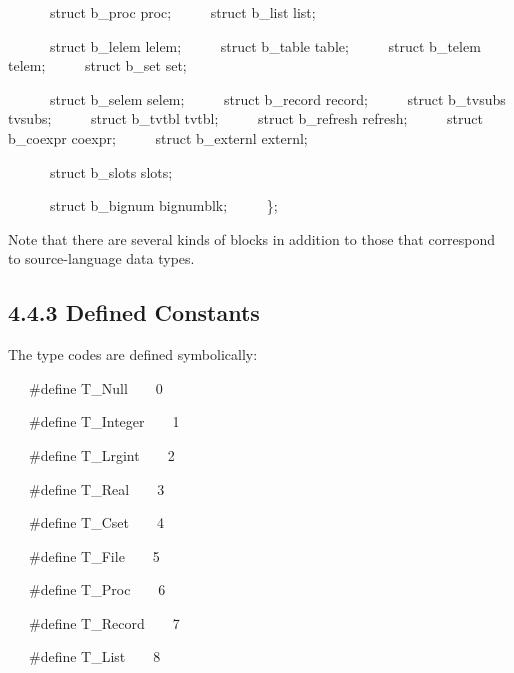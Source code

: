 {\ttfamily\mdseries
\ \ \ \ \ \ struct b\_proc proc;\newline
 \ \ \ \ \ struct b\_list list;}

{\ttfamily\mdseries
\ \ \ \ \ \ struct b\_lelem lelem;\newline
 \ \ \ \ \ struct b\_table table;\newline
 \ \ \ \ \ struct b\_telem telem;\newline
 \ \ \ \ \ struct b\_set set;}


\ \ \ \ \ \ struct b\_selem selem;\newline
 \ \ \ \ \ struct b\_record record;\newline
 \ \ \ \ \ struct b\_tvsubs tvsubs;\newline
 \ \ \ \ \ struct b\_tvtbl tvtbl;\newline
 \ \ \ \ \ struct b\_refresh refresh;\newline
 \ \ \ \ \ struct b\_coexpr coexpr;\newline
 \ \ \ \ \ struct b\_externl externl;


\ \ \ \ \ \ struct b\_slots slots;


\ \ \ \ \ \ struct b\_bignum bignumblk;\newline
 \ \ \ \ \ \};


Note that there are several kinds of blocks in addition to those that
correspond to source-language data types.

\subsection[4.4.3 Defined Constants]{4.4.3 Defined Constants}

The type codes are defined symbolically:

{\ttfamily\mdseries
\ \ \ \#define T\_Null\ \ \ \ 0}

{\ttfamily\mdseries
\ \ \ \#define T\_Integer\ \ \ \ 1}

{\ttfamily\mdseries
\ \ \ \#define T\_Lrgint\ \ \ \ 2}

{\ttfamily\mdseries
\ \ \ \#define T\_Real\ \ \ \ 3}

{\ttfamily\mdseries
\ \ \ \#define T\_Cset\ \ \ \ 4}

{\ttfamily\mdseries
\ \ \ \#define T\_File\ \ \ \ 5}

{\ttfamily\mdseries
\ \ \ \#define T\_Proc\ \ \ \ 6}

{\ttfamily\mdseries
\ \ \ \#define T\_Record\ \ \ \ 7}

{\ttfamily\mdseries
\ \ \ \#define T\_List\ \ \ \ 8}

